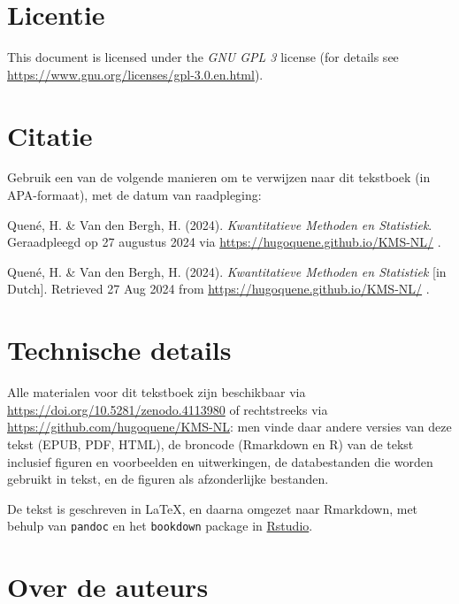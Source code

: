 \documentclass[
]{book}
\begin{document}
\section*{Licentie}\label{licentie}

This document is licensed under the \emph{GNU GPL 3} license (for details see
\url{https://www.gnu.org/licenses/gpl-3.0.en.html}).

\section*{Citatie}\label{citatie}

Gebruik een van de volgende manieren om te verwijzen naar dit tekstboek (in APA-formaat), met de datum van raadpleging:

Quené, H. \& Van den Bergh, H. (2024). \emph{Kwantitatieve Methoden en Statistiek}.
Geraadpleegd op 27 augustus 2024 via \url{https://hugoquene.github.io/KMS-NL/} .

Quené, H. \& Van den Bergh, H. (2024). \emph{Kwantitatieve Methoden en Statistiek} {[}in Dutch{]}.
Retrieved 27 Aug 2024 from \url{https://hugoquene.github.io/KMS-NL/} .

\section*{Technische details}\label{technische-details}

Alle materialen voor dit tekstboek zijn beschikbaar via \url{https://doi.org/10.5281/zenodo.4113980} of rechtstreeks via \url{https://github.com/hugoquene/KMS-NL}: men vinde daar andere versies van deze tekst (EPUB, PDF, HTML), de broncode (Rmarkdown en R) van de tekst inclusief figuren en voorbeelden en uitwerkingen, de databestanden die worden gebruikt in tekst, en de figuren als afzonderlijke bestanden.

De tekst is geschreven in LaTeX, en daarna omgezet naar Rmarkdown, met behulp van \texttt{pandoc} \citep{pandoc} en het \texttt{bookdown} package \citep{R-bookdown} in \href{https://www.rstudio.com}{Rstudio}.\\

\section*{Over de auteurs}\label{over-de-auteurs}
\end{document}
